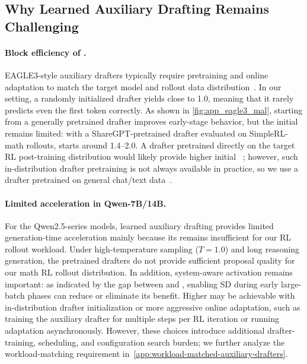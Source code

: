 


\subsection{Why Learned Auxiliary Drafting Remains Challenging}
\label{app:why-learned-auxiliary-challenging}

\paragraph{Block efficiency of \learned{}.}

EAGLE3-style auxiliary drafters typically require pretraining and online adaptation to match the target model and rollout data distribution~\citep{zhang2025fastgrpo, hu2026taming, iso2026accelerating}.
In our setting, a randomly initialized drafter yields \MAL{} close to 1.0, meaning that it rarely predicts even the first token correctly.
As shown in \cref{fig:app_eagle3_mal}, starting from a generally pretrained drafter improves early-stage behavior, but the initial \MAL{} remains limited: with a ShareGPT-pretrained drafter evaluated on SimpleRL-math rollouts, \MAL{} starts around 1.4--2.0.
A drafter pretrained directly on the target RL post-training distribution would likely provide higher initial \MAL{}~\citep{iso2026accelerating}; however, such in-distribution drafter pretraining is not always available in practice, so we use a drafter pretrained on general chat/text data~\citep{li2025eagle}.

\paragraph{Limited acceleration in Qwen-7B/14B.}

For the Qwen2.5-series models, learned auxiliary drafting provides limited generation-time acceleration mainly because its \MAL{} remains insufficient for our RL rollout workload.
Under high-temperature sampling ($T=1.0$) and long reasoning generation, the pretrained drafters do not provide sufficient proposal quality for our math RL rollout distribution.
In addition, system-aware activation remains important: as indicated by the gap between \alwayssd{} and \methodtitle{}, enabling SD during early large-batch phases can reduce or eliminate its benefit.
Higher \MAL{} may be achievable with in-distribution drafter initialization or more aggressive online adaptation, such as training the auxiliary drafter for multiple steps per RL iteration or running adaptation asynchronously.
However, these choices introduce additional drafter-training, scheduling, and configuration search burden; we further analyze the workload-matching requirement in~\cref{app:workload-matched-auxiliary-drafters}.

